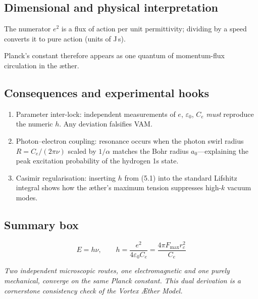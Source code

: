 \subsection{Dimensional and physical interpretation}

The numerator $e^{2}$ is a flux of action per unit permittivity; dividing by a speed converts it to pure action (units of J\,s).

Planck’s constant therefore appears as one quantum of momentum-flux circulation in the æther.

\subsection{Consequences and experimental hooks}

\begin{enumerate}
    \item Parameter inter-lock: independent measurements of $e$, $\varepsilon_0$, $C_e$ \textit{must} reproduce the numeric $h$. Any deviation falsifies VAM.
    \item Photon--electron coupling: resonance occurs when the photon swirl radius $R = C_e/(2\pi\nu)$ scaled by $1/\alpha$ matches the Bohr radius $a_0$---explaining the peak excitation probability of the hydrogen 1s state.
    \item Casimir regularisation: inserting $h$ from (5.1) into the standard Lifshitz integral shows how the æther’s maximum tension suppresses high-$k$ vacuum modes.
\end{enumerate}

\subsection{Summary box}

\[
    \boxed{
        E = h\nu,\qquad
        h = \frac{e^{2}}{4\varepsilon_0 C_e} = \frac{4\pi F_{\max} r_c^{2}}{C_e}
    }
\]

\textit{Two independent microscopic routes, one electromagnetic and one purely mechanical, converge on the same Planck constant. This dual derivation is a cornerstone consistency check of the Vortex Æther Model.}
